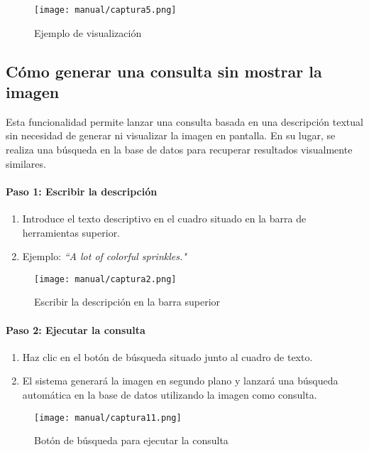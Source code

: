 \begin{figure}[H]
    \centering
    \texttt{[image: manual/captura5.png]}
    \caption{Ejemplo de visualización}
    \label{fig:ejemplo}
\end{figure}


\subsection{Cómo generar una consulta sin mostrar la imagen}

Esta funcionalidad permite lanzar una consulta basada en una descripción textual sin necesidad de generar ni visualizar la imagen en pantalla. En su lugar, se realiza una búsqueda en la base de datos para recuperar resultados visualmente similares.

\paragraph{\textbf{Paso 1: Escribir la descripción}}
\begin{enumerate}
    \item Introduce el texto descriptivo en el cuadro situado en la barra de herramientas superior.
    \item Ejemplo: \textit{``A lot of colorful sprinkles."}
\end{enumerate}

\begin{figure}[H]
    \centering
    \texttt{[image: manual/captura2.png]}
    \caption{Escribir la descripción en la barra superior}
    \label{fig:consulta-cuadro}
\end{figure}

\paragraph{\textbf{Paso 2: Ejecutar la consulta}}
\begin{enumerate}
    \item Haz clic en el botón de búsqueda situado junto al cuadro de texto.
    \item El sistema generará la imagen en segundo plano y lanzará una búsqueda automática en la base de datos utilizando la imagen como consulta.
\end{enumerate}

\begin{figure}[H]
    \centering
    \texttt{[image: manual/captura11.png]}
    \caption{Botón de búsqueda para ejecutar la consulta}
\end{figure}


